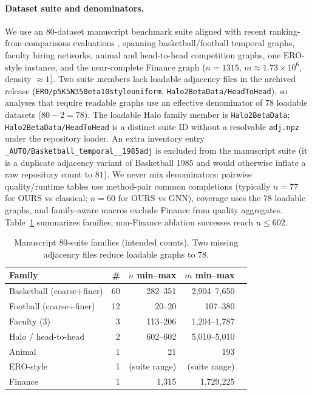 \documentclass{article}
\begin{document}
\paragraph{Dataset suite and denominators.}
We use an $80$-dataset manuscript benchmark suite aligned with recent ranking-from-comparisons evaluations \citep{he22}, spanning basketball/football temporal graphs, faculty hiring networks, animal and head-to-head competition graphs, one ERO-style instance, and the near-complete Finance graph ($n=1315$, $m\approx 1.73\times 10^{6}$, density $\approx 1$).
Two suite members lack loadable adjacency files in the archived release (\texttt{ERO/p5K5N350eta10styleuniform}, \texttt{Halo2BetaData/HeadToHead}), so analyses that require readable graphs use an effective denominator of $78$ loadable datasets ($80-2=78$).
The loadable Halo family member is \texttt{Halo2BetaData}; \texttt{Halo2BetaData/HeadToHead} is a distinct suite ID without a resolvable \texttt{adj.npz} under the repository loader.
An extra inventory entry \texttt{\_AUTO/Basketball\_temporal\_\_1985adj} is excluded from the manuscript suite (it is a duplicate adjacency variant of Basketball 1985 and would otherwise inflate a raw repository count to $81$).
We never mix denominators: pairwise quality/runtime tables use method-pair common completions (typically $n=77$ for OURS vs classical; $n=60$ for OURS vs GNN), coverage uses the $78$ loadable graphs, and family-aware macros exclude Finance from quality aggregates.
Table~\ref{tab:dataset_suite_summary} summarizes families; non-Finance ablation successes reach $n\le 602$.

\begin{table}[H]
\centering
\small
\setlength{\tabcolsep}{4pt}
\begin{tabular}{@{}lrrrr@{}}
\toprule
\textbf{Family} & \textbf{\#} & $n$ min--max & $m$ min--max \\
\midrule
Basketball (coarse+finer) & 60 & 282--351 & 2{,}904--7{,}650 \\
Football (coarse+finer) & 12 & 20--20 & 107--380 \\
Faculty (3) & 3 & 113--206 & 1{,}204--1{,}787 \\
Halo / head-to-head & 2 & 602--602 & 5{,}010--5{,}010 \\
Animal & 1 & 21 & 193 \\
ERO-style & 1 & (suite range) & (suite range) \\
Finance & 1 & 1{,}315 & 1{,}729{,}225 \\
\bottomrule
\end{tabular}
\caption{Manuscript $80$-suite families (intended counts). Two missing adjacency files reduce loadable graphs to $78$.}
\label{tab:dataset_suite_summary}
\end{table}
\end{document}
